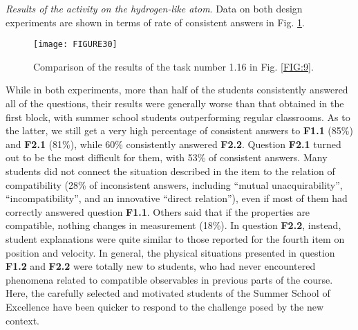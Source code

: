 \documentclass[twocolumn,secnumarabic,amssymb, nobibnotes, aps, prd, nofootinbib]{revtex4-2}
\begin{document}
\emph{Results of the activity on the hydrogen-like atom}. Data on both design experiments are shown in terms of rate of consistent answers in Fig. \ref{FIG:30}.
\begin{figure}[!htpb]
       \texttt{[image: FIGURE30]}
    \caption{Comparison of the results of the task number 1.16 in Fig. \ref{FIG:9}.}
    \label{FIG:30}
\end{figure}
While in both experiments, more than half of the students consistently answered all of the questions, their results were generally worse than that obtained in the first block, with summer school students outperforming regular classrooms. As to the latter, we still get a very high percentage of consistent answers to \textbf{F1.1} (85\%) and \textbf{F2.1} (81\%), while 60\% consistently answered \textbf{F2.2}. Question \textbf{F2.1} turned out to be the most difficult for them, with 53\% of consistent answers. Many students did not connect the situation described in the item to the relation of compatibility (28\% of inconsistent answers, including ``mutual unacquirability'', ``incompatibility'', and an innovative ``direct relation''), even if most of them had correctly answered question \textbf{F1.1}. Others said that if the properties are compatible, nothing changes in measurement (18\%). In question \textbf{F2.2}, instead, student explanations were quite similar to those reported for the fourth item on position and velocity. In general, the physical situations presented in question \textbf{F1.2} and \textbf{F2.2} were totally new to students, who had never encountered phenomena related to compatible observables in previous parts of the course. Here, the carefully selected and motivated students of the Summer School of Excellence have been quicker to respond to the challenge posed by the new context.
\end{document}

